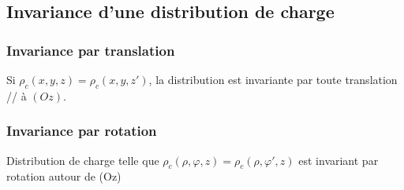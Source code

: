 \documentclass[french]{yLectureNote}
\begin{document}
\subsection{Invariance d'une distribution de charge}
\subsubsection{Invariance par translation}
Si \(\rho_c(x,y,z) = \rho_c(x,y,z')\), la distribution est invariante par toute translation // à \((Oz)\).
\subsubsection{Invariance par rotation}
Distribution de charge telle que \(\rho_c(\rho, \varphi, z) = \rho_c(\rho, \varphi', z)\) est invariant par rotation autour  de (Oz)
 
\end{document}
